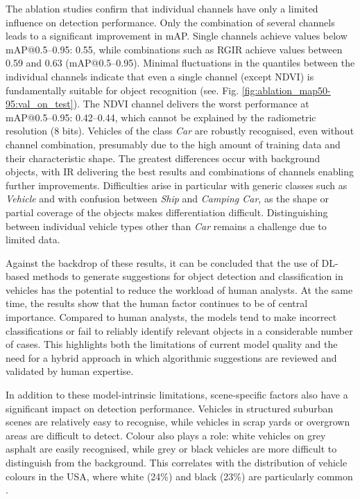 The ablation studies confirm that individual channels have only a limited influence on detection performance. Only the combination of several channels leads to a significant improvement in mAP. Single channels achieve values below \acrshort{mAP}@0.5--0.95: 0.55, while combinations such as RGIR achieve values between 0.59 and 0.63 (\acrshort{mAP}@0.5--0.95). Minimal fluctuations in the quantiles between the individual channels indicate that even a single channel (except NDVI) is fundamentally suitable for object recognition (see. Fig. \ref{fig:ablation_map50-95:val_on_test}). The NDVI channel delivers the worst performance at \acrshort{mAP}@0.5--0.95: 0.42–0.44, which cannot be explained by the radiometric resolution (8 bits). Vehicles of the class \textit{Car} are robustly recognised, even without channel combination, presumably due to the high amount of training data and their characteristic shape. The greatest differences occur with background objects, with IR delivering the best results and combinations of channels enabling further improvements. Difficulties arise in particular with generic classes such as \textit{Vehicle} and with confusion between \textit{Ship} and \textit{Camping Car}, as the shape or partial coverage of the objects makes differentiation difficult. Distinguishing between individual vehicle types other than \textit{Car} remains a challenge due to limited data.

Against the backdrop of these results, it can be concluded that the use of \acrshort{DL}-based methods to generate suggestions for object detection and classification in vehicles has the potential to reduce the workload of human analysts. At the same time, the results show that the human factor continues to be of central importance. Compared to human analysts, the models tend to make incorrect classifications or fail to reliably identify relevant objects in a considerable number of cases. This highlights both the limitations of current model quality and the need for a hybrid approach in which algorithmic suggestions are reviewed and validated by human expertise.

In addition to these model-intrinsic limitations, scene-specific factors also have a significant impact on detection performance. Vehicles in structured suburban scenes are relatively easy to recognise, while vehicles in scrap yards or overgrown areas are difficult to detect. Colour also plays a role: white vehicles on grey asphalt are easily recognised, while grey or black vehicles are more difficult to distinguish from the background. This correlates with the distribution of vehicle colours in the USA, where white (24\%) and black (23\%) are particularly common \cite{abc_utah}.

